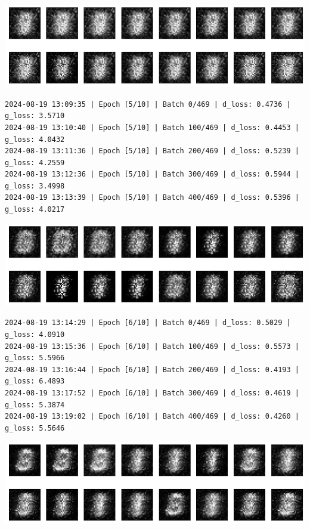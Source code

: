 \includegraphics{img/genAdvNet/gan/output_24_7.png}

\begin{lstlisting}
2024-08-19 13:09:35 | Epoch [5/10] | Batch 0/469 | d_loss: 0.4736 | g_loss: 3.5710
2024-08-19 13:10:40 | Epoch [5/10] | Batch 100/469 | d_loss: 0.4453 | g_loss: 4.0432
2024-08-19 13:11:36 | Epoch [5/10] | Batch 200/469 | d_loss: 0.5239 | g_loss: 4.2559
2024-08-19 13:12:36 | Epoch [5/10] | Batch 300/469 | d_loss: 0.5944 | g_loss: 3.4998
2024-08-19 13:13:39 | Epoch [5/10] | Batch 400/469 | d_loss: 0.5396 | g_loss: 4.0217
\end{lstlisting}

\includegraphics{img/genAdvNet/gan/output_24_9.png}

\begin{lstlisting}
2024-08-19 13:14:29 | Epoch [6/10] | Batch 0/469 | d_loss: 0.5029 | g_loss: 4.0910
2024-08-19 13:15:36 | Epoch [6/10] | Batch 100/469 | d_loss: 0.5573 | g_loss: 5.5966
2024-08-19 13:16:44 | Epoch [6/10] | Batch 200/469 | d_loss: 0.4193 | g_loss: 6.4893
2024-08-19 13:17:52 | Epoch [6/10] | Batch 300/469 | d_loss: 0.4619 | g_loss: 5.3874
2024-08-19 13:19:02 | Epoch [6/10] | Batch 400/469 | d_loss: 0.4260 | g_loss: 5.5646
\end{lstlisting}

\includegraphics{img/genAdvNet/gan/output_24_11.png}

